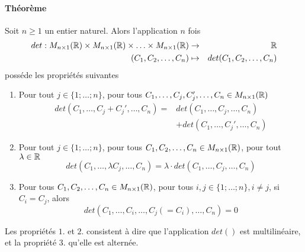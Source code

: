 \paragraph{Théorème} Soit $n\geq 1$ un entier naturel. Alors l'application $n$ fois
\begin{eqnarray*}
  det: M_{n\times 1}(\mathbb{R}) \times M_{n\times 1}(\mathbb{R}) \times \ldots \times M_{n\times 1}(\mathbb{R}) &\rightarrow& \mathbb{R} \\
  (C_1, C_2, \ldots, C_n) &\mapsto& det(C_1, C_2, \ldots, C_n)
\end{eqnarray*}
posséde les propriétés suivantes
\begin{enumerate}
  \item Pour tout $j \in \{1; \ldots; n \}$, pour tous $C_1, \ldots, C_j, C_j', \ldots, C_n \in M_{n\times 1}(\mathbb{R})$
    \begin{eqnarray*}
      det(C_1, \ldots, C_j + C_j', \ldots, C_n) =& det(C_1, \ldots, C_j, \ldots, C_n) \\
        &+ det(C_1, \ldots, C_j', \ldots, C_n)
    \end{eqnarray*}
    
  \item Pour tout $j \in \{1; \ldots; n\}$, pour tous $C_1, C_2, \ldots, C_n \in M_{n\times 1}(\mathbb{R})$, pour tout $\lambda \in \mathbb{R}$
    $$det(C_1, \ldots, \lambda C_j, \ldots, C_n) = \lambda \cdot det(C_1, \ldots, C_j, \ldots, C_n)$$
    
  \item Pour tous $C_1, C_2, \ldots, C_n \in M_{n\times 1}(\mathbb{R})$, pour tous $i, j \in \{1; \ldots; n\}, i \neq j$, si $C_i = C_j$, alors
    $$det(C_1, \ldots, C_i, \ldots, C_j(=C_i), \ldots, C_n) = 0$$
\end{enumerate}
Les propriétés $1.$ et $2.$ consistent à dire que l'application $det()$ est multilinéaire, et la propriété $3.$ qu'elle est alternée.


